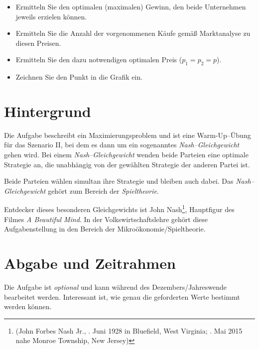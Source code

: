 \documentclass[paper=a4,notitlepage,parskip=half,plainheadsepline]{scrartcl}
\newif\ifloesung
\begin{document}
\begin{itemize}
\item Ermitteln Sie den optimalen (maximalen) Gewinn, den beide Unternehmen jeweils erzielen können.
\item Ermitteln Sie die Anzahl der vorgenommenen Käufe gemäß Marktanalyse zu diesen Preisen.
\item Ermitteln Sie den dazu notwendigen optimalen Preis ($p_1=p_2=p$).
\item Zeichnen Sie den Punkt in die Grafik ein.
\end{itemize}


\section{Hintergrund}
Die Aufgabe beschreibt ein Maximierungsproblem und ist eine Warm-Up--Übung für das Szenario II, bei dem es dann um ein sogenanntes  \emph{Nash--Gleichgewicht} gehen wird.
Bei einem \emph{Nash--Gleichgewicht} wenden beide Parteien eine optimale Strategie an, die unabhängig von der gewählten Strategie der anderen Partei ist.

Beide Parteien wählen simultan ihre Strategie und bleiben auch dabei. Das \emph{Nash--Gleichgewicht} gehört zum Bereich der \emph{Spieltheorie}.

Entdecker dieses besonderen Gleichgewichts ist John Nash\footnote{(John Forbes Nash Jr., . Juni 1928 in Bluefield, West Virginia; . Mai 2015 nahe Monroe Township, New Jersey)}, Hauptfigur des Filmes \emph{A Beautiful Mind}. In der Volkswirtschaftslehre gehört diese Aufgabenstellung in den Bereich der Mikroökonomie/Spieltheorie.

\section{Abgabe und Zeitrahmen}
Die Aufgabe ist \emph{optional} und kann während des Dezembers/Jahreswende bearbeitet werden.
Interessant ist, wie genau die geforderten Werte bestimmt werden können.

\ifloesung
\newpage
\section{Musterlösung}

\newpage
\mylisting[label=musterloesung1]{Musterlösung}{pirate.c}{c}


\fi
\end{document}
